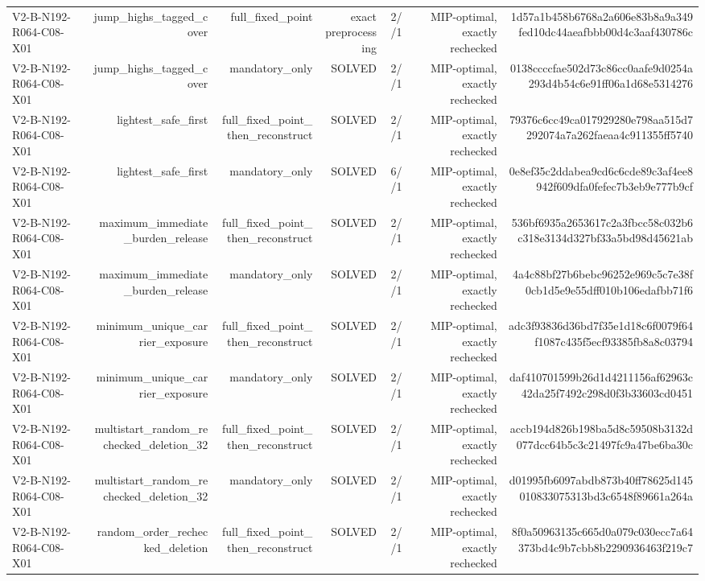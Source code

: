{\begin{longtable}{lrrrrrr}
V2-B-N192-R064-C08-X01 & jump\_highs\_tagged\_cover & full\_fixed\_point & exact preprocessing & 2//1 & MIP-optimal, exactly rechecked & 1d57a1b458b6768a2a606e83b8a9a349fed10dc44aeafbbb00d4c3aaf430786c \\
V2-B-N192-R064-C08-X01 & jump\_highs\_tagged\_cover & mandatory\_only & SOLVED & 2//1 & MIP-optimal, exactly rechecked & 0138ccccfae502d73c86cc0aafe9d0254a293d4b54c6e91ff06a1d68e5314276 \\
V2-B-N192-R064-C08-X01 & lightest\_safe\_first & full\_fixed\_point\_then\_reconstruct & SOLVED & 2//1 & MIP-optimal, exactly rechecked & 79376c6cc49ca017929280e798aa515d7292074a7a262faeaa4c911355ff5740 \\
V2-B-N192-R064-C08-X01 & lightest\_safe\_first & mandatory\_only & SOLVED & 6//1 & MIP-optimal, exactly rechecked & 0e8ef35c2ddabea9cd6c6cde89c3af4ee8942f609dfa0fefec7b3eb9e777b9cf \\
V2-B-N192-R064-C08-X01 & maximum\_immediate\_burden\_release & full\_fixed\_point\_then\_reconstruct & SOLVED & 2//1 & MIP-optimal, exactly rechecked & 536bf6935a2653617c2a3fbcc58c032b6c318e3134d327bf33a5bd98d45621ab \\
V2-B-N192-R064-C08-X01 & maximum\_immediate\_burden\_release & mandatory\_only & SOLVED & 2//1 & MIP-optimal, exactly rechecked & 4a4c88bf27b6bebc96252e969c5c7e38f0cb1d5e9e55dff010b106edafbb71f6 \\
V2-B-N192-R064-C08-X01 & minimum\_unique\_carrier\_exposure & full\_fixed\_point\_then\_reconstruct & SOLVED & 2//1 & MIP-optimal, exactly rechecked & adc3f93836d36bd7f35e1d18c6f0079f64f1087c435f5ecf93385fb8a8c03794 \\
V2-B-N192-R064-C08-X01 & minimum\_unique\_carrier\_exposure & mandatory\_only & SOLVED & 2//1 & MIP-optimal, exactly rechecked & daf410701599b26d1d4211156af62963c42da25f7492c298d0f3b33603cd0451 \\
V2-B-N192-R064-C08-X01 & multistart\_random\_rechecked\_deletion\_32 & full\_fixed\_point\_then\_reconstruct & SOLVED & 2//1 & MIP-optimal, exactly rechecked & accb194d826b198ba5d8c59508b3132d077dcc64b5c3c21497fc9a47be6ba30c \\
V2-B-N192-R064-C08-X01 & multistart\_random\_rechecked\_deletion\_32 & mandatory\_only & SOLVED & 2//1 & MIP-optimal, exactly rechecked & d01995fb6097abdb873b40ff78625d145010833075313bd3c6548f89661a264a \\
V2-B-N192-R064-C08-X01 & random\_order\_rechecked\_deletion & full\_fixed\_point\_then\_reconstruct & SOLVED & 2//1 & MIP-optimal, exactly rechecked & 8f0a50963135c665d0a079c030ecc7a64373bd4c9b7cbb8b2290936463f219c7 \\

\end{longtable}}
